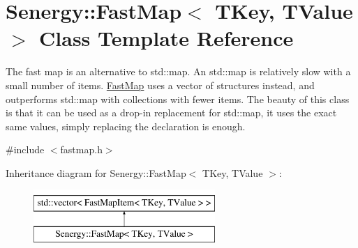 \hypertarget{class_senergy_1_1_fast_map}{\section{Senergy\-:\-:Fast\-Map$<$ T\-Key, T\-Value $>$ Class Template Reference}
\label{class_senergy_1_1_fast_map}
}


The fast map is an alternative to std\-::map. An std\-::map is relatively slow with a small number of items. \hyperlink{class_senergy_1_1_fast_map}{Fast\-Map} uses a vector of structures instead, and outperforms std\-::map with collections with fewer items. The beauty of this class is that it can be used as a drop-\/in replacement for std\-::map, it uses the exact same values, simply replacing the declaration is enough.  




{\ttfamily \#include $<$fastmap.\-h$>$}

Inheritance diagram for Senergy\-:\-:Fast\-Map$<$ T\-Key, T\-Value $>$\-:\begin{figure}[H]
\begin{center}
\leavevmode
\includegraphics[height=2.000000cm]{class_senergy_1_1_fast_map}
\end{center}
\end{figure}
